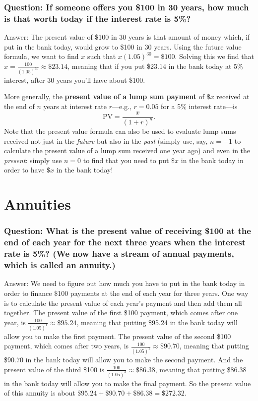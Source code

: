 \subsubsection{Question\rm : If someone offers you \$100 in 30 years, how much is that worth today if the interest rate is 5\%?}

Answer: The present value of \$100 in 30 years is that amount of money which, if put in the bank today, would grow to \$100 in 30 years. Using the future value formula, we want to find $x$ such that $x(1.05)^{30}=\$100$. Solving this we find that $\displaystyle x=\frac{100}{(1.05)^{30}}\approx\$23.14$, meaning that if you put \$23.14 in the bank today at 5\% interest, after 30 years you'll have about \$100.

More generally, the \textbf{present value of a lump sum payment} of $\$x$ received at the end of $n$ years at interest rate $r$---e.g., $r=0.05$ for a 5\% interest rate---is \[\displaystyle \mbox{PV} = \frac{x}{(1+r)^{n}}.\]
%
Note that the present value formula can also be used to evaluate lump sums received not just in the \emph{future} but also in the \emph{past} (simply use, say, $n=-1$ to calculate the present value of a lump sum received one year ago) and even in the \emph{present}: simply use $n=0$ to find that you need to put $\$x$ in the bank today in order to have $\$x$ in the bank today!




\section{Annuities}

\subsubsection{Question\rm : What is the present value of receiving \$100 at the end of each year for the next three years when the interest rate is 5\%? (We now have a stream of annual payments, which is called an \textbf{annuity}.)}

\medskip \noindent Answer: We need to figure out how much you have to put in the bank today in order to finance \$100 payments at the end of each year for three years. One way is to calculate the present value of each year's payment and then add them all together. The present value of the first \$100 payment, which comes after one year, is $\displaystyle \frac{100}{(1.05)^1}\approx \$95.24$, meaning that putting \$95.24 in the bank today will allow you to make the first payment. The present value of the second \$100 payment, which comes after two years, is $\displaystyle \frac{100}{(1.05)^2}\approx \$90.70$, meaning that putting \$90.70 in the bank today will allow you to make the second payment. And the present value of the third \$100 is $\displaystyle \frac{100}{(1.05)^3}\approx \$86.38$, meaning that putting \$86.38 in the bank today will allow you to make the final payment. So the present value of this annuity is about $\$95.24+\$90.70+\$86.38 = \$272.32.$


